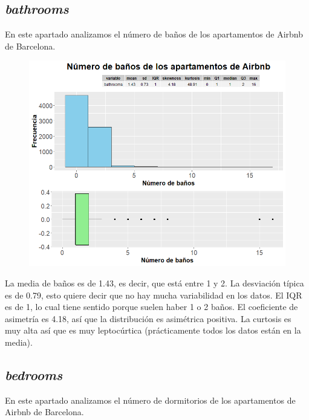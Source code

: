 \documentclass{article}
\begin{document}
\clearpage
\subsection{\emph{bathrooms}}
En este apartado analizamos el número de baños de los apartamentos de Airbnb de Barcelona.

\vspace{0.35cm}
\begin{figure}[h]
\hspace*{-0.15cm}
\centering
\includegraphics[scale = 0.6]{grafico_bathrooms}
\end{figure}
\vspace{0.15cm}

La media de baños es de 1.43, es decir, que está entre 1 y 2.
La desviación típica es de 0.79, esto quiere decir que no hay mucha variabilidad en los datos.
El IQR es de 1, lo cual tiene sentido porque suelen haber 1 o 2 baños.
El coeficiente de asimetría es 4.18, así que la distribución es asimétrica positiva.
La curtosis es muy alta así que es muy leptocúrtica (prácticamente todos los datos están en la media).

\clearpage
\subsection{\emph{bedrooms}}
En este apartado analizamos el número de dormitorios de los apartamentos de Airbnb de Barcelona.
\end{document}
